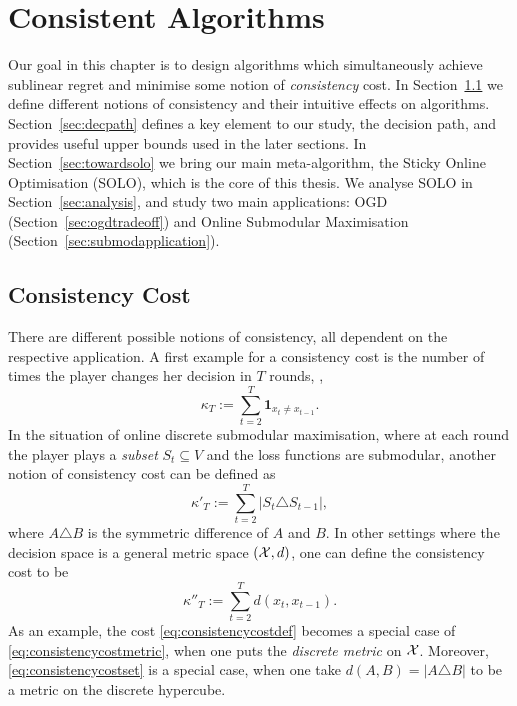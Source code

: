 \chapter{Consistent Algorithms}
Our goal in this chapter is to design algorithms which simultaneously achieve sublinear regret and minimise some notion of {\em consistency} cost. In Section~\ref{sec:cost} we define different notions of consistency and their intuitive effects on algorithms. Section~\ref{sec:decpath} defines a key element to our study, the decision path, and provides useful upper bounds used in the later sections. In Section~\ref{sec:towardsolo} we bring our main meta-algorithm, the Sticky Online Optimisation (SOLO), which is the core of this thesis. We analyse SOLO in Section~\ref{sec:analysis}, and study two main applications: OGD (Section~\ref{sec:ogdtradeoff}) and Online Submodular Maximisation (Section~\ref{sec:submodapplication}).

\section{Consistency Cost}\label{sec:cost}
There are different possible notions of consistency, all dependent on the respective application. A first example for a consistency cost is the number of times the player changes her decision in $T$ rounds, \ie,
\begin{equation}\label{eq:consistencycostdef}
    \kappa_T := \sum_{t = 2}^T \mathbf{1}_{x_{t} \not= x_{t - 1}}.
\end{equation}
In the situation of online discrete submodular maximisation, where at each round the player plays a \emph{subset} $S_t \subseteq V$ and the loss functions are submodular, another notion of consistency cost can be defined as 
\begin{equation}\label{eq:consistencycostset}
    \kappa'_T := \sum_{t=2}^T |S_t \triangle S_{t-1}|,
\end{equation}
where $A\triangle B$ is the symmetric difference of $A$ and $B$. In other settings where the decision space is a general metric space $(\mathcal{X}, d)$, one can define the consistency cost to be
\begin{equation}\label{eq:consistencycostmetric}
    \kappa''_T := \sum_{t=2}^T d(x_t, x_{t-1}).
\end{equation}
As an example, the cost \eqref{eq:consistencycostdef} becomes a special case of \eqref{eq:consistencycostmetric}, when one puts the \emph{discrete metric} on $\mathcal{X}$. Moreover, \eqref{eq:consistencycostset} is a special case, when one take $d(A, B) = |A\triangle B|$ to be a metric on the discrete hypercube.

